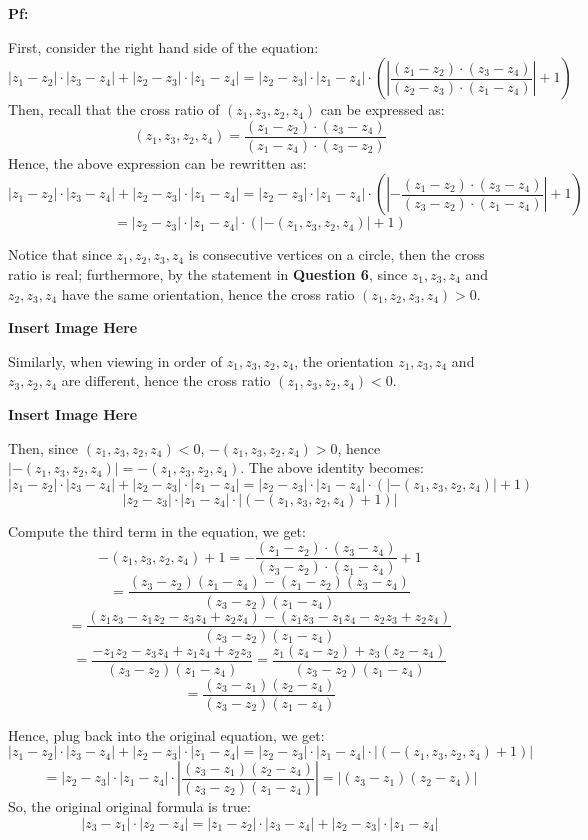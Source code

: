 \documentclass{article}
\begin{document}
\textbf{Pf:}

First, consider the right hand side of the equation:
$$|z_1-z_2|\cdot|z_3-z_4|+|z_2-z_3|\cdot|z_1-z_4| = |z_2-z_3|\cdot|z_1-z_4|\cdot\left(\left|\frac{(z_1-z_2)\cdot(z_3-z_4)}{(z_2-z_3)\cdot(z_1-z_4)}\right|+1\right)$$
Then, recall that the cross ratio of $(z_1,z_3,z_2,z_4)$ can be expressed as:
$$(z_1,z_3,z_2,z_4)=\frac{(z_1-z_2)\cdot(z_3-z_4)}{(z_1-z_4)\cdot(z_3-z_2)}$$
Hence, the above expression can be rewritten as:
$$|z_1-z_2|\cdot|z_3-z_4|+|z_2-z_3|\cdot|z_1-z_4| = |z_2-z_3|\cdot|z_1-z_4|\cdot\left(\left|-\frac{(z_1-z_2)\cdot(z_3-z_4)}{(z_3-z_2)\cdot(z_1-z_4)}\right|+1\right)$$
$$=|z_2-z_3|\cdot|z_1-z_4|\cdot(|-(z_1,z_3,z_2,z_4)|+1)$$

\hfill

Notice that since $z_1,z_2,z_3,z_4$ is consecutive vertices on a circle, then the cross ratio is real; 
furthermore, by the statement in \textbf{Question 6}, since $z_1,z_3,z_4$ and $z_2,z_3,z_4$ have the same orientation,
hence the cross ratio $(z_1,z_2,z_3,z_4)>0$.

\textbf{Insert Image Here}

\hfill

Similarly, when viewing in order of $z_1,z_3,z_2,z_4$, the orientation $z_1,z_3,z_4$ and $z_3,z_2,z_4$ are different,
hence the cross ratio $(z_1,z_3,z_2,z_4)<0$.

\textbf{Insert Image Here}

\hfill

Then, since $(z_1,z_3,z_2,z_4)<0$, $-(z_1,z_3,z_2,z_4)>0$, hence $|-(z_1,z_3,z_2,z_4)|=-(z_1,z_3,z_2,z_4)$. The above identity becomes:
$$|z_1-z_2|\cdot|z_3-z_4|+|z_2-z_3|\cdot|z_1-z_4|=|z_2-z_3|\cdot|z_1-z_4|\cdot(|-(z_1,z_3,z_2,z_4)|+1)$$
$$|z_2-z_3|\cdot|z_1-z_4|\cdot|(-(z_1,z_3,z_2,z_4)+1)|$$

Compute the third term in the equation, we get:
$$-(z_1,z_3,z_2,z_4)+1=-\frac{(z_1-z_2)\cdot(z_3-z_4)}{(z_3-z_2)\cdot(z_1-z_4)}+1$$
$$=\frac{(z_3-z_2)(z_1-z_4)-(z_1-z_2)(z_3-z_4)}{(z_3-z_2)(z_1-z_4)}$$
$$=\frac{(z_1z_3-z_1z_2-z_3z_4+z_2z_4)-(z_1z_3-z_1z_4-z_2z_3+z_2z_4)}{(z_3-z_2)(z_1-z_4)}$$
$$=\frac{-z_1z_2-z_3z_4+z_1z_4+z_2z_3}{(z_3-z_2)(z_1-z_4)}=\frac{z_1(z_4-z_2)+z_3(z_2-z_4)}{(z_3-z_2)(z_1-z_4)}$$
$$=\frac{(z_3-z_1)(z_2-z_4)}{(z_3-z_2)(z_1-z_4)}$$

Hence, plug back into the original equation, we get:
$$|z_1-z_2|\cdot|z_3-z_4|+|z_2-z_3|\cdot|z_1-z_4|=|z_2-z_3|\cdot|z_1-z_4|\cdot|(-(z_1,z_3,z_2,z_4)+1)|$$
$$=|z_2-z_3|\cdot|z_1-z_4|\cdot\left|\frac{(z_3-z_1)(z_2-z_4)}{(z_3-z_2)(z_1-z_4)}\right|=\left|(z_3-z_1)(z_2-z_4)\right|$$
So, the original original formula is true:
$$|z_3-z_1|\cdot|z_2-z_4|=|z_1-z_2|\cdot|z_3-z_4|+|z_2-z_3|\cdot|z_1-z_4|$$
\end{document}
